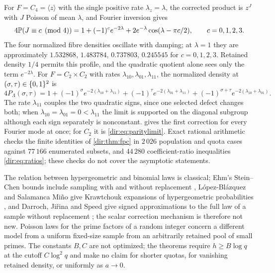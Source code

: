 \begin{example}\label{dir:ex:fourfibre}
For $F=C_4=\langle z\rangle$ with the single positive rate $\lambda_z=\lambda$, the corrected product is
$z^J$ with $J$ Poisson of mean $\lambda$, and Fourier inversion gives
\begin{equation}\label{dir:eq:c4}
 4\mathbb{P}(J\equiv c\pmod4)=1+(-1)^ce^{-2\lambda}+2e^{-\lambda}\cos(\lambda-\pi c/2),\qquad c=0,1,2,3 .
\end{equation}
The four normalized fibre densities oscillate with damping; at $\lambda=1$ they are approximately
$1.532868$, $1.483784$, $0.737803$, $0.245545$ for $c=0,1,2,3$. Retained density $1/4$ permits this
profile, and the quadratic quotient alone sees only the term $e^{-2\lambda}$. For $F=C_2\times C_2$ with
rates $\lambda_{10},\lambda_{01},\lambda_{11}$, the normalized density at $(\sigma,\tau)\in\{0,1\}^2$ is
\begin{equation}\label{dir:eq:v4}
 4P_\Lambda(\sigma,\tau)=1+(-1)^\sigma e^{-2(\lambda_{10}+\lambda_{11})}+(-1)^\tau e^{-2(\lambda_{01}+\lambda_{11})}
 +(-1)^{\sigma+\tau}e^{-2(\lambda_{10}+\lambda_{01})} .
\end{equation}
The rate $\lambda_{11}$ couples the two quadratic signs, since one selected defect changes both; when
$\lambda_{10}=\lambda_{01}=0<\lambda_{11}$ the limit is supported on the diagonal subgroup although each
sign separately is nonconstant.  gives the first correction for every Fourier mode at
once; for $C_2$ it is \eqref{dir:eq:paritylimit}. Exact rational arithmetic checks the finite identities
of \cref{dir:thm:fpc} in $2\,026$ population and quota cases against $77\,166$ enumerated subsets, and
$44\,280$ coefficient-ratio inequalities \eqref{dir:eq:ratios}; these checks do not cover the asymptotic
statements.
\end{example}

The relation between hypergeometric and binomial laws is classical; Ehm's Stein--Chen bounds include
sampling with and without replacement \cite{Ehm1991Binomial}, L\'opez-Bl\'azquez and Salamanca Mi\~no give
Krawtchouk expansions of hypergeometric probabilities \cite{LopezBlazquezSalamancaMino2000Binomial}, and
Darroch, Ji\v rina and Speed give signed approximations to the full law of a sample without replacement
\cite{DarrochJirinaSpeed1988Sampling}; the scalar correction mechanism is therefore not new. Poisson laws
for the prime factors of a random integer \cite{Ford2021Joint} concern a different model from a uniform
fixed-size sample from an arbitrarily retained pool of small primes. The constants $B,C$ are not optimized;
the theorems require $h\ge B\log q$ at the cutoff $C\log^2q$ and make no claim for shorter quotas, for
vanishing retained density, or uniformly as $a\to0$.

